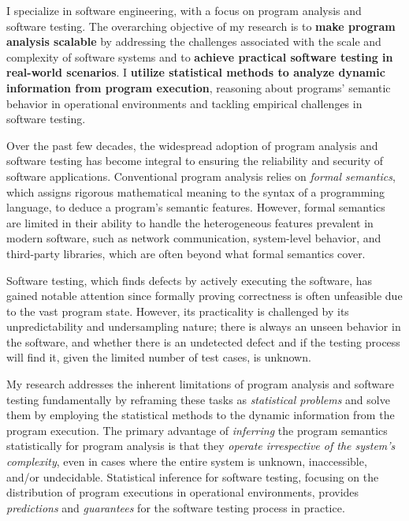 \documentclass{article}
\begin{document}
\thispagestyle{firstpage} %


\noindent I specialize in software engineering, with a focus on program analysis and software testing. The overarching objective of my research is to \textbf{\color{blue} make program analysis scalable} by addressing the challenges associated with the scale and complexity of software systems and to \textbf{\color{blue} achieve practical software testing in real-world scenarios}. I \textbf{utilize statistical methods to analyze dynamic information from program execution}, reasoning about programs' semantic behavior in operational environments and tackling empirical challenges in software testing.

Over the past few decades, the widespread adoption of program analysis and software testing has become integral to ensuring the reliability and security of software applications. Conventional program analysis relies on \emph{formal semantics}, which assigns rigorous mathematical meaning to the syntax of a programming language, to deduce a program's semantic features. However, formal semantics are limited in their ability to handle the heterogeneous features prevalent in modern software, such as network communication, system-level behavior, and third-party libraries, which are often beyond what formal semantics cover.


Software testing, which finds defects by actively executing the software, has gained notable attention since formally proving correctness is often unfeasible due to the vast program state. However, its practicality is challenged by its unpredictability and undersampling nature; there is always an unseen behavior in the software, and whether there is an undetected defect and if the testing process will find it, given the limited number of test cases, is unknown.

My research addresses the inherent limitations of program analysis and software testing fundamentally by reframing these tasks as \emph{statistical problems} and solve them by employing the statistical methods to the dynamic information from the program execution. The primary advantage of \emph{inferring} the program semantics statistically for program analysis is that they \emph{operate irrespective of the system's complexity}, even in cases where the entire system is unknown, inaccessible, and/or undecidable. Statistical inference for software testing, focusing on the 
distribution of program executions in operational environments,
provides \emph{predictions} and \emph{guarantees} for the software testing process in practice.
\end{document}
